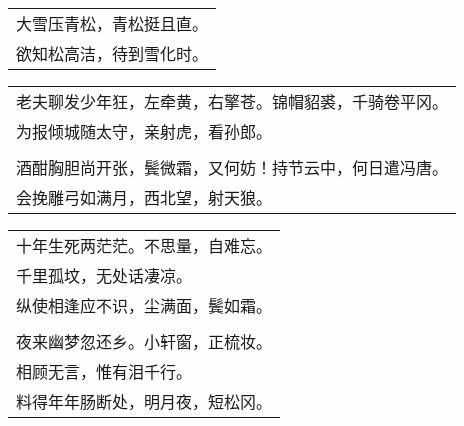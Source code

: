\nopagebreak%
\nopagebreak%
\noindent\begin{minipage}{\linewidth}
  \vskip-3pt\begin{table}[H]
    \centering
    \begin{tabular}{@{}l@{}}
大雪压青松，青松挺且直。\\
欲知松高洁，待到雪化时。
    \end{tabular}
  \end{table}
\end{minipage}
\vspace{1cm}


\nopagebreak%
\nopagebreak%
\noindent\begin{minipage}{\linewidth}
  \vskip-3pt\begin{table}[H]
    \centering
    \begin{tabular}{@{}l@{}}
老夫聊发少年狂，左牵黄，右擎苍。锦帽貂裘，千骑卷平冈。\\
为报倾城随太守，亲射虎，看孙郎。\\
\\
酒酣胸胆尚开张，鬓微霜，又何妨！持节云中，何日遣冯唐。\\
会挽雕弓如满月，西北望，射天狼。
    \end{tabular}
  \end{table}
\end{minipage}
\vspace{1cm}


\nopagebreak%
\nopagebreak%
\noindent\begin{minipage}{\linewidth}
  \vskip-3pt\begin{table}[H]
    \centering
    \begin{tabular}{@{}l@{}}
十年生死两茫茫。不思量，自难忘。\\
千里孤坟，无处话凄凉。\\
纵使相逢应不识，尘满面，鬓如霜。\\
\\
夜来幽梦忽还乡。小轩窗，正梳妆。\\
相顾无言，惟有泪千行。\\
料得年年肠断处，明月夜，短松冈。
    \end{tabular}
  \end{table}
\end{minipage}
\vspace{1cm}


